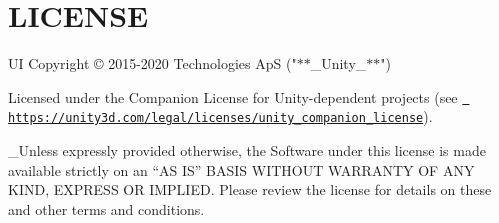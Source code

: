 \chapter{LICENSE}
\hypertarget{md__hey_tea_9_2_library_2_package_cache_2com_8unity_8ugui_0d1_80_80_2_l_i_c_e_n_s_e}{}\label{md__hey_tea_9_2_library_2_package_cache_2com_8unity_8ugui_0d1_80_80_2_l_i_c_e_n_s_e}
 UI Copyright © 2015-\/2020  Technologies ApS ("{}\texorpdfstring{$\ast$}{*}\texorpdfstring{$\ast$}{*}\+\_\+\+Unity\+\_\+\texorpdfstring{$\ast$}{*}\texorpdfstring{$\ast$}{*}"{})

Licensed under the  Companion License for Unity-\/dependent projects (see \href{https://unity3d.com/legal/licenses/unity_companion_license}{\texttt{ https\+://unity3d.\+com/legal/licenses/unity\+\_\+companion\+\_\+license}}).

\+\_\+\+Unless expressly provided otherwise, the Software under this license is made available strictly on an “\+AS IS” BASIS WITHOUT WARRANTY OF ANY KIND, EXPRESS OR IMPLIED. Please review the license for details on these and other terms and conditions. 
